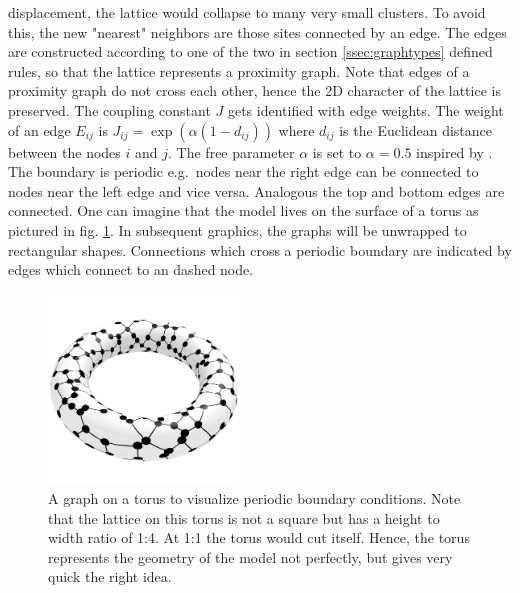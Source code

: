     displacement, the lattice would collapse to many very small clusters.
    To avoid this, the new "nearest" neighbors are those sites connected
    by an edge. The edges are constructed according to
    one of the two in section \ref{ssec:graphtypes} defined rules,
    so that the lattice represents a proximity graph. Note that edges
    of a proximity graph do not cross each other, hence the 2D character
    of the lattice is preserved. The coupling constant \(J\) gets
    identified with edge weights. The weight of an edge \(E_{ij}\) is
    \(J_{ij} = \exp (\alpha (1-d_{ij}))\) where \(d_{ij}\) is the Euclidean
    distance between the nodes \(i\) and \(j\). The free parameter
    \(\alpha\) is set to \(\alpha = 0.5\) inspired by \cite{Lima2000}.
    The boundary is periodic e.g.\ nodes near the right edge can be
    connected to nodes near the left edge and vice versa. Analogous the
    top and bottom edges are connected. One can imagine that the model
    lives on the surface of a torus as pictured in fig. \ref{fig:torusRNG}.
    In subsequent graphics, the graphs will be unwrapped to rectangular
    shapes. Connections which cross a periodic boundary are indicated
    by edges which connect to an dashed node.
    \begin{figure}[htbp]
        \centering
        \includegraphics[width=0.45\textwidth]{images/torus}
        \caption[A Graph on a Torus to Visualise Periodic Boundary Conditions]
        {
            A graph on a torus to visualize periodic boundary conditions.
            Note that the lattice on this torus is not a square but has
            a height to width ratio of 1:4. At 1:1 the torus would cut
            itself. Hence, the torus represents the geometry of the model
            not perfectly, but gives very quick the right idea.
        }
        \label{fig:torusRNG}
    \end{figure}\\
